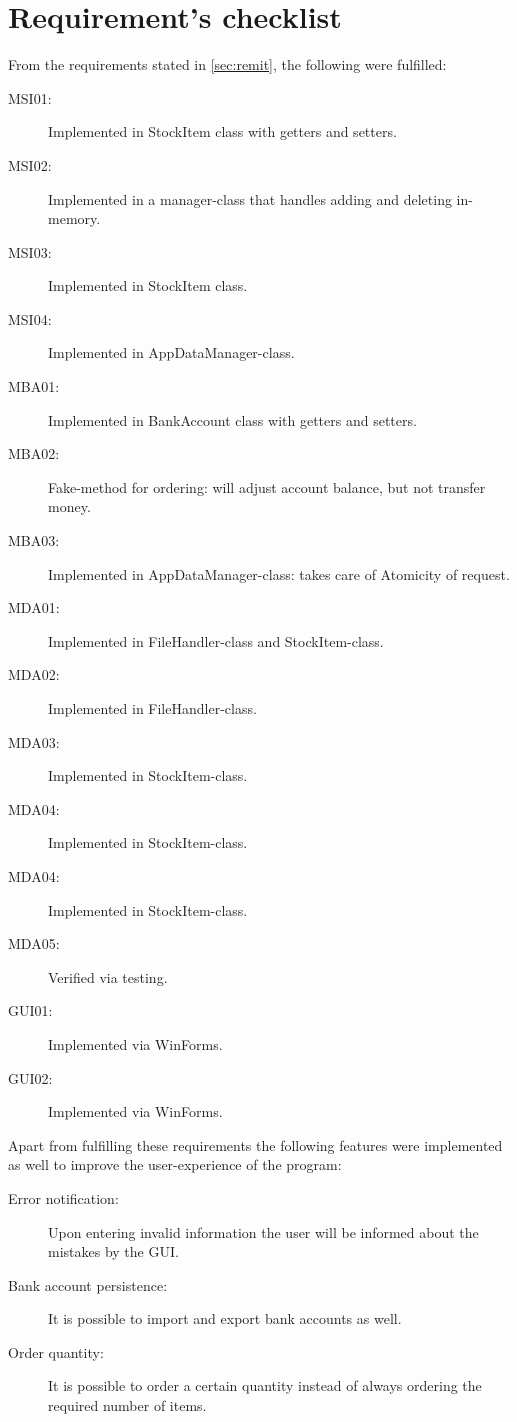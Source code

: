 \chapter{Requirement's checklist}\label{ch:requirements} %

From the requirements stated in \autoref{sec:remit}, the following were fulfilled:

\begin{description}
\item[MSI01:] Implemented in StockItem class with getters and setters.
\item[MSI02:] Implemented in a manager-class that handles adding and deleting in-memory.
\item[MSI03:] Implemented in StockItem class.
\item[MSI04:] Implemented in AppDataManager-class.
\item[MBA01:] Implemented in BankAccount class with getters and setters.
\item[MBA02:] Fake-method for ordering: will adjust account balance, but not transfer money.
\item[MBA03:] Implemented in AppDataManager-class: takes care of Atomicity of request.
\item[MDA01:] Implemented in FileHandler-class and StockItem-class.
\item[MDA02:] Implemented in FileHandler-class.
\item[MDA03:] Implemented in StockItem-class.
\item[MDA04:] Implemented in StockItem-class.
\item[MDA04:] Implemented in StockItem-class.
\item[MDA05:] Verified via testing.
\item[GUI01:] Implemented via WinForms.
\item[GUI02:] Implemented via WinForms.
\end{description}

Apart from fulfilling these requirements the following features were implemented as well to improve the user-experience of the program:

\begin{description}
\item[Error notification:] Upon entering invalid information the user will be informed about the mistakes by the \ac{GUI}.
\item[Bank account persistence:] It is possible to import and export bank accounts as well.
\item[Order quantity:] It is possible to order a certain quantity instead of always ordering the required number of items.
\end{description}